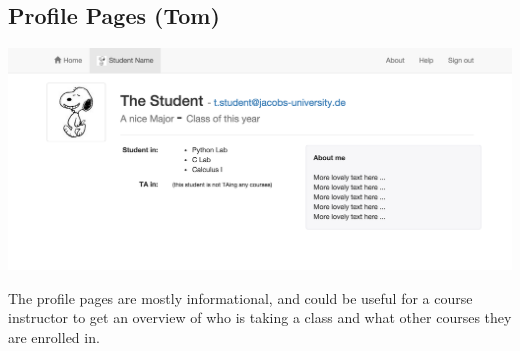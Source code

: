 \subsection{Profile Pages (Tom)}

\includegraphics[width=\textwidth]{screenshots/StudentProfile.png}

The profile pages are mostly informational, and could be useful for a course instructor to get an overview of who is taking a class and what other courses they are enrolled in. 